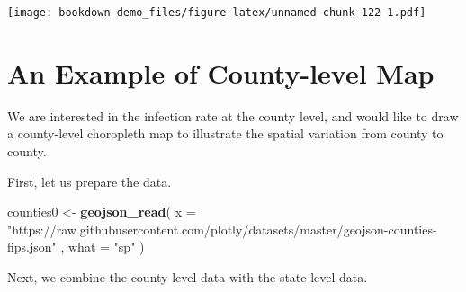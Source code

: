 \documentclass[]{book}
\newenvironment{Shaded}{\begin{snugshade}}{\end{snugshade}}
\newcommand{\KeywordTok}[1]{\textcolor[rgb]{0.13,0.29,0.53}{\textbf{#1}}}
\newcommand{\DataTypeTok}[1]{\textcolor[rgb]{0.13,0.29,0.53}{#1}}
\newcommand{\StringTok}[1]{\textcolor[rgb]{0.31,0.60,0.02}{#1}}
\newcommand{\NormalTok}[1]{#1}
\begin{document}
\texttt{[image: bookdown-demo\_files/figure-latex/unnamed-chunk-122-1.pdf]}

\section{An Example of County-level
Map}\label{an-example-of-county-level-map}

We are interested in the infection rate at the county level, and would
like to draw a county-level choropleth map to illustrate the spatial
variation from county to county.

First, let us prepare the data.

\begin{Shaded}
\begin{Highlighting}[]
\NormalTok{counties0 <-}\StringTok{ }\KeywordTok{geojson_read}\NormalTok{(}
\DataTypeTok{x =} \StringTok{"https://raw.githubusercontent.com/plotly/datasets/master/geojson-counties-fips.json"}
\NormalTok{, }\DataTypeTok{what =} \StringTok{"sp"}
\NormalTok{)}
\end{Highlighting}
\end{Shaded}

Next, we combine the county-level data with the state-level data.
\end{document}
